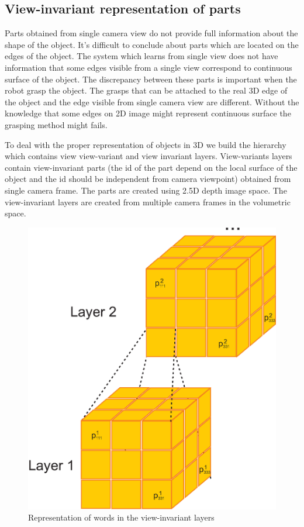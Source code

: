 \documentclass[letterpaper,10pt,conference]{ieeeconf}  %
\begin{document}
\subsection{View-invariant representation of parts}

Parts obtained from single camera view do not provide full information about the shape of the object. It's difficult to conclude about parts which are located on the edges of the object. The system which learns from single view does not have information that some edges visible from a single view correspond to continuous surface of the object. The discrepancy between these parts is important when the robot grasp the object. The grasps that can be attached to the real 3D edge of the object and the edge visible from single camera view are different. Without the knowledge that some edges on 2D image might represent continuous surface the grasping method might fails.

To deal with the proper representation of objects in 3D we build the hierarchy which contains view view-variant and view invariant layers. View-variants layers contain view-invariant parts (the id of the part depend on the local surface of the object and the id should be independent from camera viewpoint) obtained from single camera frame. The parts are created using 2.5D depth image space. The view-invariant layers are created from multiple camera frames in the volumetric space.

\begin{figure}[t]
 \centering
\includegraphics[width=0.75\columnwidth]{images/wordInd.eps}
\caption{Representation of words in the view-invariant layers}
 \label{wordInv}
\end{figure}
\end{document}
